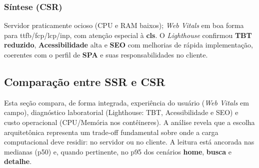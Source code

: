 \subsubsection{Síntese (CSR)}
Servidor praticamente ocioso (CPU e RAM baixos); \emph{Web Vitals} em boa forma para \acrshort{ttfb}/\acrshort{fcp}/\acrshort{lcp}/\acrshort{inp}, com atenção especial à \textbf{\acrshort{cls}}. O \emph{Lighthouse} confirmou \textbf{TBT reduzido}, \textbf{Acessibilidade} alta e \textbf{SEO} com melhorias de rápida implementação, coerentes com o perfil de \textbf{SPA} e suas responsabilidades no cliente.

\subsection{Comparação entre SSR e CSR}
\label{subsec:comparacao-ssr-csr}

Esta seção compara, de forma integrada, experiência do usuário (\emph{Web Vitals} em campo), diagnóstico laboratorial (Lighthouse: TBT, Acessibilidade e SEO) e custo operacional (CPU/Memória nos contêineres). A análise revela que a escolha arquitetônica representa um trade-off fundamental sobre onde a carga computacional deve residir: no servidor ou no cliente. A leitura está ancorada nas medianas (p50) e, quando pertinente, no p95 dos cenários \textbf{home}, \textbf{busca} e \textbf{detalhe}.

